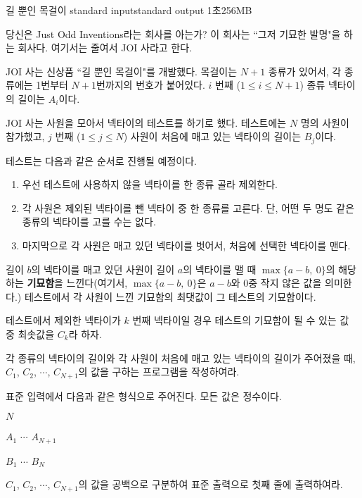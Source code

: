 \begin{problem}{길 뿐인 목걸이}
	{standard input}{standard output}
	{1초}{256MB}{}
	
	당신은 Just Odd Inventions라는 회사를 아는가? 이 회사는 ``그저 기묘한 발명"을 하는 회사다. 여기서는 줄여서 JOI 사라고 한다.
	
	JOI 사는 신상품 ``길 뿐인 목걸이"를 개발했다. 목걸이는 $N+1$ 종류가 있어서, 각 종류에는 1번부터 $N+1$번까지의 번호가 붙어있다. $i$ 번째 ($1 \le i \le N+1$) 종류 넥타이의 길이는 $A_i$이다.
	
	JOI 사는 사원을 모아서 넥타이의 테스트를 하기로 했다. 테스트에는 $N$ 명의 사원이 참가했고, $j$ 번째 ($1 \le j \le N$) 사원이 처음에 매고 있는 넥타이의 길이는 $B_j$이다.
	
	테스트는 다음과 같은 순서로 진행될 예정이다.
	
	\begin{enumerate}
		\item 우선 테스트에 사용하지 않을 넥타이를 한 종류 골라 제외한다.
		\item 각 사원은 제외된 넥타이를 뺀 넥타이 중 한 종류를 고른다. 단, 어떤 두 명도 같은 종류의 넥타이를 고를 수는 없다.
		\item 마지막으로 각 사원은 매고 있던 넥타이를 벗어서, 처음에 선택한 넥타이를 맨다.
	\end{enumerate}

	길이 $b$의 넥타이를 매고 있던 사원이 길이 $a$의 넥타이를 맬 때 $\max\{a-b, \ 0\}$의 해당하는 \textbf{기묘함}을 느낀다(여기서, $\max\{a-b, \ 0\}$은 $a-b$와 0중 작지 않은 값을 의미한다.) 테스트에서 각 사원이 느낀 기묘함의 최댓값이 그 테스트의 기묘함이다.
	
	테스트에서 제외한 넥타이가 $k$ 번째 넥타이일 경우 테스트의 기묘함이 될 수 있는 값 중 최솟값을 $C_k$라 하자.
	
	각 종류의 넥타이의 길이와 각 사원이 처음에 매고 있는 넥타이의 길이가 주어졌을 때, $C_1$, $C_2$, $\cdots$, $C_{N+1}$의 값을 구하는 프로그램을 작성하여라.
	
	\InputFile
	
	표준 입력에서 다음과 같은 형식으로 주어진다. 모든 값은 정수이다.

	$N$
	
	$A_1$ $\cdots$ $A_{N+1}$
	
	$B_1$ $\cdots$ $B_{N}$
	
	\OutputFile
	
	$C_1$, $C_2$, $\cdots$, $C_{N+1}$의 값을 공백으로 구분하여 표준 출력으로 첫째 줄에 출력하여라.
	\Constraints
	

\end{problem}

